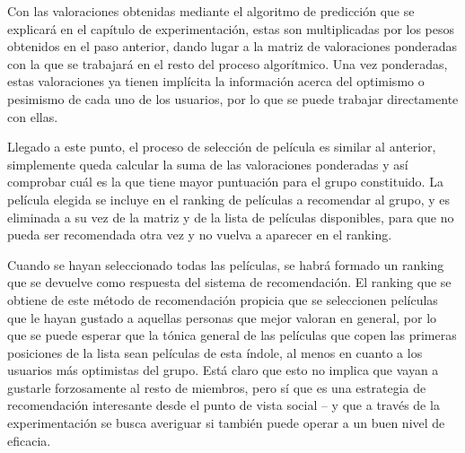 Con las valoraciones obtenidas mediante el algoritmo de predicción que se explicará en el capítulo de experimentación, estas son multiplicadas por los pesos obtenidos en el paso anterior, dando lugar a la matriz de valoraciones ponderadas con la que se trabajará en el resto del proceso algorítmico. Una vez ponderadas, estas valoraciones ya tienen implícita la información acerca del optimismo o pesimismo de cada uno de los usuarios, por lo que se puede trabajar directamente con ellas.

Llegado a este punto, el proceso de selección de película es similar al anterior, simplemente queda calcular la suma de las valoraciones ponderadas y así comprobar cuál es la que tiene mayor puntuación para el grupo constituido. La película elegida se incluye en el ranking de películas a recomendar al grupo, y es eliminada a su vez de la matriz y de la lista de películas disponibles, para que no pueda ser recomendada otra vez y no vuelva a aparecer en el ranking.

Cuando se hayan seleccionado todas las películas, se habrá formado un ranking que se devuelve como respuesta del sistema de recomendación. El ranking que se obtiene de este método de recomendación propicia que se seleccionen películas que le hayan gustado a aquellas personas que mejor valoran en general, por lo que se puede esperar que la tónica general de las películas que copen las primeras posiciones de la lista sean películas de esta índole, al menos en cuanto a los usuarios más optimistas del grupo. Está claro que esto no implica que vayan a gustarle forzosamente al resto de miembros, pero sí que es una estrategia de recomendación interesante desde el punto de vista social -- y que a través de la experimentación se busca averiguar si también puede operar a un buen nivel de eficacia.